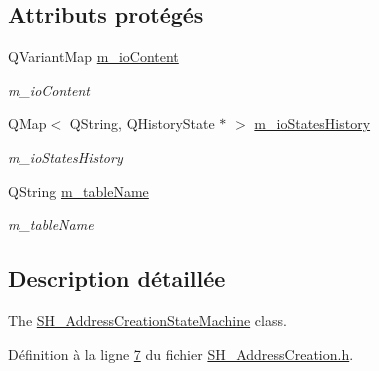 \subsection*{Attributs protégés}
\begin{DoxyCompactItemize}
\item 
Q\-Variant\-Map \hyperlink{classSH__InOutStateMachine_a661a1c7bd3b1086b3b5cd60ca957ecbd}{m\-\_\-io\-Content}
\begin{DoxyCompactList}\small\item\em m\-\_\-io\-Content \end{DoxyCompactList}\item 
Q\-Map$<$ Q\-String, Q\-History\-State $\ast$ $>$ \hyperlink{classSH__InOutStateMachine_aaca2ea542b3f5b4cd238396b07492455}{m\-\_\-io\-States\-History}
\begin{DoxyCompactList}\small\item\em m\-\_\-io\-States\-History \end{DoxyCompactList}\item 
Q\-String \hyperlink{classSH__InOutStateMachine_acc0f5d5133af2dcca30939f53ec8837b}{m\-\_\-table\-Name}
\begin{DoxyCompactList}\small\item\em m\-\_\-table\-Name \end{DoxyCompactList}\end{DoxyCompactItemize}


\subsection{Description détaillée}
The \hyperlink{classSH__AddressCreationStateMachine}{S\-H\-\_\-\-Address\-Creation\-State\-Machine} class. 

Définition à la ligne \hyperlink{SH__AddressCreation_8h_source_l00007}{7} du fichier \hyperlink{SH__AddressCreation_8h_source}{S\-H\-\_\-\-Address\-Creation.\-h}.



